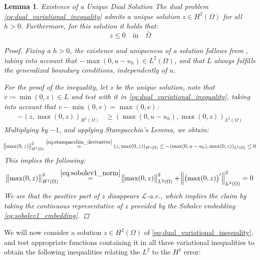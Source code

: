 \documentclass[headsepline,footsepline,footinclude=false,oneside,fontsize=11pt,paper=a4,listof=totoc,bibliography=totoc]{scrbook} %
\newtheorem{lemma}{Lemma}
\begin{document}
\begin{lemma}Existence of a Unique Dual Solution \newline 
	The dual problem \eqref{eq:dual_variational_inequality} admits a unique solution $z \in H^2(\Omega)$ for all $h > 0$. Furthermore, for this solution it holds that:
	\begin{equation} \label{eq:dual_solution_nonpositive}
	z \leq 0 \quad \text{in} \quad \bar{\Omega}
	\end{equation}
	\begin{proof}
		Fixing a $h>0$, the existence and uniqueness of a solution follows from , taking into account that $-\max(0,u-u_h) \in L^2(\Omega)$, and that $L$ always fulfills the generalized boundary conditions, independently of $u$.
		
		For the proof of the inequality, let $z$ be the unique solution, note that $v \coloneqq \min(0,z) \in L$ and test with it in \eqref{eq:dual_variational_inequality}, taking into account that $v - \min(0,v) = \max(0,v)$:
		\begin{align*}
			-(z,\max(0,z))_{H^1(\Omega)} &\geq (\max(0,u-u_h), \max(0,z))_{L^2(\Omega)} 
		\end{align*}
		Multiplying by $-1$, and applying Stampacchia's Lemma, we obtain:
		\begin{align*}
		\norm{\max(0,z)}_{H^1(\Omega)}^2 \overset{\eqref{eq:stampacchia_derivative}}{=} (z,\max(0,z))_{H^1(\Omega)} \leq - (\max(0,u-u_h), \max(0,z))_{L^2(\Omega)} \leq 0
		\end{align*}
		This implies the following:
		\begin{equation*}
		\norm{\max(0,z)}_{H^1(\Omega)}^2 \overset{\eqref{eq:sobolev1_norm}}{=}\norm{\max(0,z)}_{L^2(\Omega)}^2 + \norm{\left(\max(0,z)\right)'}_{L^2(\Omega)}^2 = 0
		\end{equation*}
		We see that the positive part of $z$ disappears $\mathcal{L}$-a.e., which implies the claim by taking the continuous representative of $z$ provided by the Sobolev embedding \eqref{eq:sobolev1_embedding}.
	\end{proof}
\end{lemma}


We will now consider a solution $z \in H^2(\Omega)$ of \eqref{eq:dual_variational_inequality}, and test appropriate functions containing it in all three variational inequalities to obtain the following inequalities relating the $L^2$ to the $H^1$ error:
\end{document}
